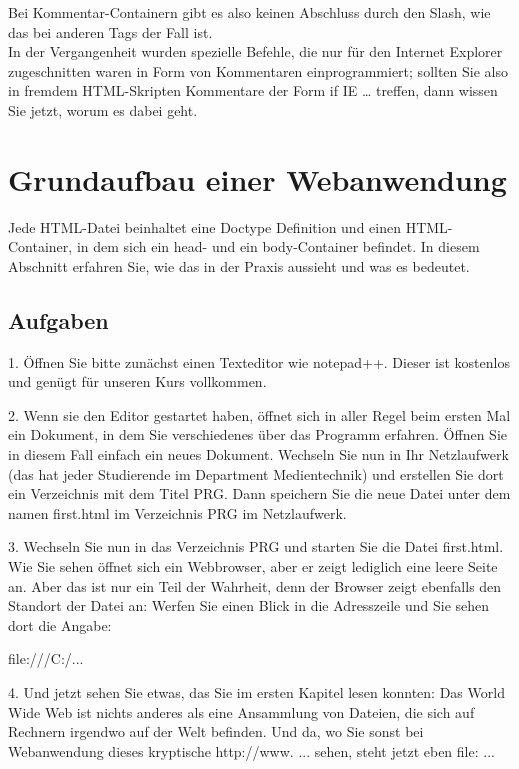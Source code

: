 Bei Kommentar-Containern gibt es also keinen Abschluss durch den Slash, wie das bei anderen Tags der Fall ist.\\

In der Vergangenheit wurden spezielle Befehle, die nur für den Internet Explorer zugeschnitten waren in Form von Kommentaren einprogrammiert; sollten Sie also in fremdem HTML-Skripten Kommentare der Form if IE … treffen, dann wissen Sie jetzt, worum es dabei geht.\\

\section{Grundaufbau einer Webanwendung}

Jede HTML-Datei beinhaltet eine Doctype Definition und einen HTML-Container, in dem sich ein head- und ein body-Container befindet. In diesem Abschnitt erfahren Sie, wie das in der Praxis aussieht und was es bedeutet.\\

\subsection{Aufgaben}

1.	Öffnen Sie bitte zunächst einen Texteditor wie notepad++. Dieser ist kostenlos und genügt für unseren Kurs vollkommen.

2.	Wenn sie den Editor gestartet haben, öffnet sich in aller Regel beim ersten Mal ein Dokument, in dem Sie verschiedenes über das Programm erfahren. Öffnen Sie in diesem Fall einfach ein neues Dokument. Wechseln Sie nun in Ihr Netzlaufwerk (das hat jeder Studierende im Department Medientechnik) und erstellen Sie dort ein Verzeichnis mit dem Titel PRG. Dann speichern Sie die neue Datei unter dem namen first.html im Verzeichnis PRG im Netzlaufwerk.

3.	Wechseln Sie nun in das Verzeichnis PRG und starten Sie die Datei first.html. Wie Sie sehen öffnet sich ein Webbrowser, aber er zeigt lediglich eine leere Seite an. Aber das ist nur ein Teil der Wahrheit, denn der Browser zeigt ebenfalls den Standort der Datei an: Werfen Sie einen Blick in die Adresszeile und Sie sehen dort die Angabe:

file:///C:/...

4.	Und jetzt sehen Sie etwas, das Sie im ersten Kapitel lesen konnten: Das World Wide Web ist nichts anderes als eine Ansammlung von Dateien, die sich auf Rechnern irgendwo auf der Welt befinden. Und da, wo Sie sonst bei Webanwendung dieses kryptische http://www. ... sehen, steht jetzt eben file: ... 

